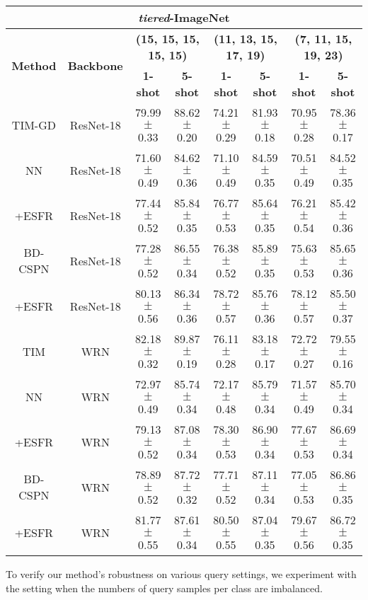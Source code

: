 \documentclass{article}
\begin{document}
\begin{table}[t]
\begin{small}
\begin{center}
\begin{tabular}{cccccccc}
				
				\multicolumn{8}{c}{\textbf{\textit{tiered}-ImageNet}} \\ \hline
				\multirow{2}{*}{\textbf{Method}} & \multirow{2}{*}{\textbf{Backbone}} & \multicolumn{2}{c}{\textbf{(15, 15, 15, 15, 15)}} & \multicolumn{2}{c}{\textbf{(11, 13, 15, 17, 19)}} & \multicolumn{2}{c}{\textbf{(7, 11, 15, 19, 23)}} \\
				&  & \textbf{1-shot} & \textbf{5-shot} & \textbf{1-shot} & \textbf{5-shot} & \textbf{1-shot} & \textbf{5-shot} \\ \hline
				TIM-GD & ResNet-18 & 79.99$\pm$0.33 & 88.62$\pm$0.20 & 74.21$\pm$0.29 & 81.93$\pm$0.18 & 70.95$\pm$0.28 & 78.36$\pm$0.17 \\ \hline
				NN & ResNet-18 & 71.60$\pm$0.49 & 84.62$\pm$0.36 & 71.10$\pm$0.49 & 84.59$\pm$0.35 & 70.51$\pm$0.49 & 84.52$\pm$0.35 \\
				\rowcolor[HTML]{EFEFEF}+ESFR & ResNet-18 & 77.44$\pm$0.52 & 85.84$\pm$0.35 & 76.77$\pm$0.53 & 85.64$\pm$0.35 & 76.21$\pm$0.54 & 85.42$\pm$0.36 \\ \hline
				BD-CSPN & ResNet-18 & 77.28$\pm$0.52 & 86.55$\pm$0.34 & 76.38$\pm$0.52 & 85.89$\pm$0.35 & 75.63$\pm$0.53 & 85.65$\pm$0.36 \\
				\rowcolor[HTML]{EFEFEF}+ESFR & ResNet-18 & 80.13$\pm$0.56 & 86.34$\pm$0.36 & 78.72$\pm$0.57 & 85.76$\pm$0.36 & 78.12$\pm$0.57 & 85.50$\pm$0.37 \\ \hline
				TIM & WRN & 82.18$\pm$0.32 & 89.87$\pm$0.19 & 76.11$\pm$0.28 & 83.18$\pm$0.17 & 72.72$\pm$0.27 & 79.55$\pm$0.16 \\ \hline
				NN & WRN & 72.97$\pm$0.49 & 85.74$\pm$0.34 & 72.17$\pm$0.48 & 85.79$\pm$0.34 & 71.57$\pm$0.49 & 85.70$\pm$0.34 \\
				\rowcolor[HTML]{EFEFEF}+ESFR & WRN & 79.13$\pm$0.52 & 87.08$\pm$0.34 & 78.30$\pm$0.53 & 86.90$\pm$0.34 & 77.67$\pm$0.53 & 86.69$\pm$0.34 \\ \hline
				BD-CSPN & WRN & 78.89$\pm$0.52 & 87.72$\pm$0.32 & 77.71$\pm$0.52 & 87.11$\pm$0.34 & 77.05$\pm$0.53 & 86.86$\pm$0.35 \\
				\rowcolor[HTML]{EFEFEF}+ESFR & WRN & 81.77$\pm$0.55 & 87.61$\pm$0.34 & 80.50$\pm$0.55 & 87.04$\pm$0.35 & 79.67$\pm$0.56 & 86.72$\pm$0.35 \\ \hline
			\end{tabular}
		\end{center}
	\end{small}
\end{table}
To verify our method's robustness on various query settings, we experiment with the setting when the numbers of query samples per class are imbalanced.
\end{document}
